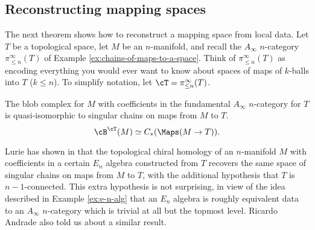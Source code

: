 

\medskip

\subsection{Reconstructing mapping spaces}
\label{sec:map-recon}

The next theorem shows how to reconstruct a mapping space from local data.
Let $T$ be a topological space, let $M$ be an $n$-manifold, 
and recall the $A_\infty$ $n$-category $\pi^\infty_{\leq n}(T)$ 
of Example \ref{ex:chains-of-maps-to-a-space}.
Think of $\pi^\infty_{\leq n}(T)$ as encoding everything you would ever
want to know about spaces of maps of $k$-balls into $T$ ($k\le n$).
To simplify notation, let $\cT = \pi^\infty_{\leq n}(T)$.

\begin{thm}
\label{thm:map-recon}
The blob complex for $M$ with coefficients in the fundamental $A_\infty$ $n$-category for $T$ 
is quasi-isomorphic to singular chains on maps from $M$ to $T$.
$$\cB^\cT(M) \simeq C_*(\Maps(M\to T)).$$
\end{thm}
\begin{rem}
Lurie has shown in \cite[Theorem 3.8.6]{0911.0018} that the topological chiral homology 
of an $n$-manifold $M$ with coefficients in a certain $E_n$ algebra constructed from $T$ recovers 
the same space of singular chains on maps from $M$ to $T$, with the additional hypothesis that $T$ is $n-1$-connected.
This extra hypothesis is not surprising, in view of the idea described in Example \ref{ex:e-n-alg} 
that an $E_n$ algebra is roughly equivalent data to an $A_\infty$ $n$-category which 
is trivial at all but the topmost level.
Ricardo Andrade also told us about a similar result.
\end{rem}

